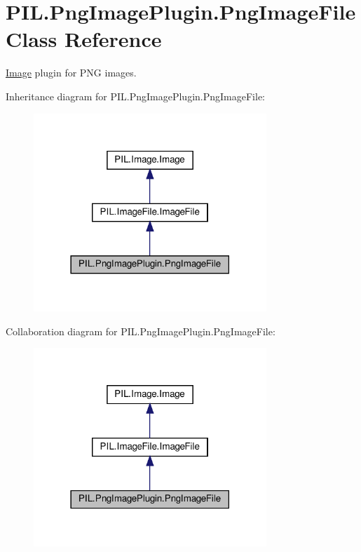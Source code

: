 \hypertarget{classPIL_1_1PngImagePlugin_1_1PngImageFile}{}\section{P\+I\+L.\+Png\+Image\+Plugin.\+Png\+Image\+File Class Reference}
\label{classPIL_1_1PngImagePlugin_1_1PngImageFile}


\hyperlink{namespacePIL_1_1Image}{Image} plugin for P\+NG images.  




Inheritance diagram for P\+I\+L.\+Png\+Image\+Plugin.\+Png\+Image\+File\+:
\nopagebreak
\begin{figure}[H]
\begin{center}
\leavevmode
\includegraphics[width=249pt]{classPIL_1_1PngImagePlugin_1_1PngImageFile__inherit__graph}
\end{center}
\end{figure}


Collaboration diagram for P\+I\+L.\+Png\+Image\+Plugin.\+Png\+Image\+File\+:
\nopagebreak
\begin{figure}[H]
\begin{center}
\leavevmode
\includegraphics[width=249pt]{classPIL_1_1PngImagePlugin_1_1PngImageFile__coll__graph}
\end{center}
\end{figure}
